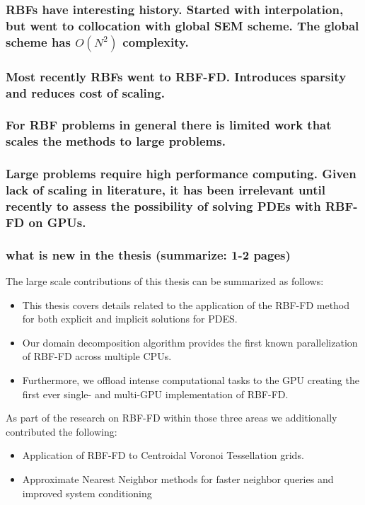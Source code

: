 \documentclass[11pt]{report}
\begin{document}
\subsubsection{ RBFs have interesting history. Started with interpolation, but went to collocation with global SEM scheme. The global scheme has $O(N^{2})$ complexity.}

\subsubsection{Most recently RBFs went to RBF-FD. Introduces sparsity and reduces cost of scaling.}


\subsubsection{For RBF problems in general there is limited work that scales the methods to large problems.}


\subsubsection{Large problems require high performance computing. Given lack of scaling in literature, it has been irrelevant until recently to assess the possibility of solving PDEs with RBF-FD on GPUs.}

\subsubsection{what is new in the thesis (summarize: 1-2 pages)}

The large scale contributions of this thesis can be summarized as follows: 
\begin{itemize} 
\item This thesis covers details related to the application of the RBF-FD method for both explicit and implicit solutions for PDES. 
\item Our domain decomposition algorithm provides the first known parallelization of RBF-FD across multiple CPUs.
\item Furthermore, we offload intense computational tasks to the GPU creating the first ever single- and multi-GPU implementation of RBF-FD. 
\end{itemize}
As part of the research on RBF-FD within those three areas we additionally contributed the following: 
\begin{itemize} 
\item Application of RBF-FD to Centroidal Voronoi Tessellation grids. 
\item Approximate Nearest Neighbor methods for faster neighbor queries and improved system conditioning
 \end{itemize} 
\end{document}
